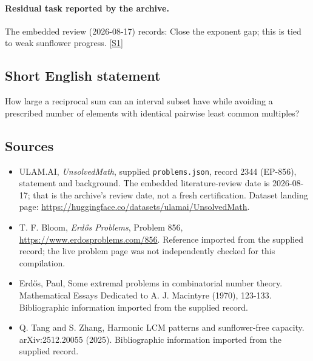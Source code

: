 \documentclass[11pt,a4paper]{article}
\newcommand{\sref}[2]{\hyperlink{source:#1:#2}{[S#2]}}
\begin{document}
\paragraph{Residual task reported by the archive.}

The embedded review (2026-08-17) records: Close the exponent gap; this is tied to weak sunflower progress. \sref{2344}{1}

\subsection{Short English statement}

How large a reciprocal sum can an interval subset have while avoiding a prescribed number of elements with identical pairwise least common multiples?

\subsection{Sources}

{\small

\begin{itemize}

\item[\hypertarget{source:2344:1}{S1}] ULAM.AI, \emph{UnsolvedMath}, supplied \texttt{problems.json}, record 2344 (EP-856), statement and background. The embedded literature-review date is 2026-08-17; that is the archive’s review date, not a fresh certification. Dataset landing page: \url{https://huggingface.co/datasets/ulamai/UnsolvedMath}.

\item[\hypertarget{source:2344:2}{S2}] T. F. Bloom, \emph{Erdős Problems}, Problem 856, \url{https://www.erdosproblems.com/856}. Reference imported from the supplied record; the live problem page was not independently checked for this compilation.

\item[\hypertarget{source:2344:3}{S3}] Erd\H{o}s, Paul, Some extremal problems in combinatorial number theory. Mathematical Essays Dedicated to A. J. Macintyre (1970), 123-133. Bibliographic information imported from the supplied record.

\item[\hypertarget{source:2344:4}{S4}] Q. Tang and S. Zhang, Harmonic LCM patterns and sunflower-free capacity. arXiv:2512.20055 (2025). Bibliographic information imported from the supplied record.

\end{itemize}

}

\label{end:2344}
\end{document}
